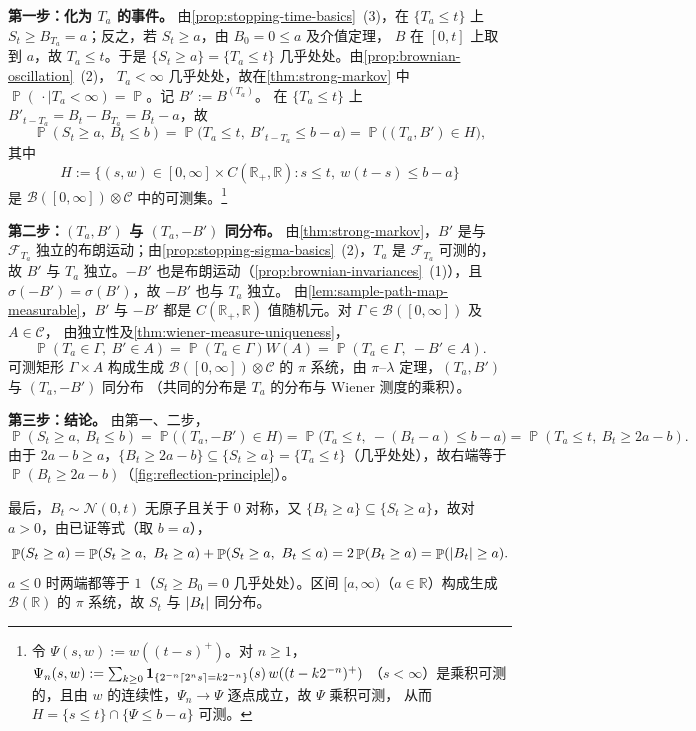 \documentclass[UTF8,11pt,a4paper,oneside,fontset=fandol]{ctexrep}
\makeatletter
\numberwithin{equation}{section}
\theoremstyle{zhthm}
\renewenvironment{proof}[1][\proofname]{\par
  \pushQED{\qed}%
  \normalfont\topsep6\p@\@plus6\p@\relax
  \trivlist
  \item[\hskip\labelsep\bfseries#1\hspace{0.5em}]\ignorespaces
}{%
  \popQED\endtrivlist\@endpefalse
}
\renewcommand{\proofname}{证明}
\newcommand{\R}{\mathbb{R}}
\newcommand{\B}{\mathcal{B}}
\newcommand{\F}{\mathcal{F}}
\DeclareMathOperator{\Prob}{\mathbb{P}}
\newcommand{\Normal}{\mathcal{N}}
\newcommand{\ind}[1]{\mathbf{1}_{#1}}
\DeclarePairedDelimiter{\abs}{\lvert}{\rvert}
\DeclarePairedDelimiter{\ceil}{\lceil}{\rceil}
\makeatother
\begin{document}
\begin{proof}
\textbf{\boldmath 第一步：化为 $T_a$ 的事件。}
由\cref{prop:stopping-time-basics}~(3)，在 $\{T_a\le t\}$ 上 $S_t\ge B_{T_a}=a$；反之，若 $S_t\ge a$，由 $B_0=0\le a$ 及介值定理，
$B$ 在 $[0,t]$ 上取到 $a$，故 $T_a\le t$。于是 $\{S_t\ge a\}=\{T_a\le t\}$ 几乎处处。由\cref{prop:brownian-oscillation}~(2)，
$T_a<\infty$ 几乎处处，故在\cref{thm:strong-markov} 中 $\Prob(\,\cdot\mid T_a<\infty)=\Prob$。记 $B':=B^{(T_a)}$。
在 $\{T_a\le t\}$ 上 $B'_{t-T_a}=B_t-B_{T_a}=B_t-a$，故
\[
  \Prob(S_t\ge a,\ B_t\le b)=\Prob\bigl(T_a\le t,\ B'_{t-T_a}\le b-a\bigr)=\Prob\bigl((T_a,B')\in H\bigr),
\]
其中
\[
  H:=\bigl\{(s,w)\in[0,\infty]\times C(\R_+,\R):s\le t,\ w(t-s)\le b-a\bigr\}
\]
是 $\B([0,\infty])\otimes\mathscr C$ 中的可测集。\footnote{%
  令 $\Psi(s,w):=w((t-s)^+)$。对 $n\ge1$，$\Psi_n(s,w):=\sum_{k\ge0}\ind{\{2^{-n}\ceil{2^ns}=k2^{-n}\}}(s)\,w((t-k2^{-n})^+)$
  （$s<\infty$）是乘积可测的，且由 $w$ 的连续性，$\Psi_n\to\Psi$ 逐点成立，故 $\Psi$ 乘积可测，
  从而 $H=\{s\le t\}\cap\{\Psi\le b-a\}$ 可测。}

\textbf{\boldmath 第二步：$(T_a,B')$ 与 $(T_a,-B')$ 同分布。}
由\cref{thm:strong-markov}，$B'$ 是与 $\F_{T_a}$ 独立的布朗运动；由\cref{prop:stopping-sigma-basics}~(2)，$T_a$ 是 $\F_{T_a}$ 可测的，
故 $B'$ 与 $T_a$ 独立。$-B'$ 也是布朗运动（\cref{prop:brownian-invariances}~(1)），且 $\sigma(-B')=\sigma(B')$，故 $-B'$ 也与 $T_a$ 独立。
由\cref{lem:sample-path-map-measurable}，$B'$ 与 $-B'$ 都是 $C(\R_+,\R)$ 值随机元。对 $\Gamma\in\B([0,\infty])$ 及 $A\in\mathscr C$，
由独立性及\cref{thm:wiener-measure-uniqueness}，
\[
  \Prob(T_a\in\Gamma,\ B'\in A)=\Prob(T_a\in\Gamma)W(A)=\Prob(T_a\in\Gamma,\ -B'\in A).
\]
可测矩形 $\Gamma\times A$ 构成生成 $\B([0,\infty])\otimes\mathscr C$ 的 $\pi$ 系统，由 $\pi$--$\lambda$ 定理，$(T_a,B')$ 与 $(T_a,-B')$ 同分布
（共同的分布是 $T_a$ 的分布与 Wiener 测度的乘积）。

\textbf{第三步：结论。} 由第一、二步，
\[
  \Prob(S_t\ge a,\ B_t\le b)=\Prob\bigl((T_a,-B')\in H\bigr)=\Prob\bigl(T_a\le t,\ -(B_t-a)\le b-a\bigr)=\Prob(T_a\le t,\ B_t\ge2a-b).
\]
由于 $2a-b\ge a$，$\{B_t\ge2a-b\}\subseteq\{S_t\ge a\}=\{T_a\le t\}$（几乎处处），故右端等于 $\Prob(B_t\ge2a-b)$（\cref{fig:reflection-principle}）。

最后，$B_t\sim\Normal(0,t)$ 无原子且关于 $0$ 对称，又 $\{B_t\ge a\}\subseteq\{S_t\ge a\}$，故对 $a>0$，由已证等式（取 $b=a$），
\[
  \Prob(S_t\ge a)=\Prob(S_t\ge a,\ B_t\ge a)+\Prob(S_t\ge a,\ B_t\le a)=2\Prob(B_t\ge a)=\Prob(\abs{B_t}\ge a).
\]
$a\le0$ 时两端都等于 $1$（$S_t\ge B_0=0$ 几乎处处）。区间 $[a,\infty)$（$a\in\R$）构成生成 $\B(\R)$ 的 $\pi$ 系统，故 $S_t$ 与 $\abs{B_t}$ 同分布。
\end{proof}
\end{document}
